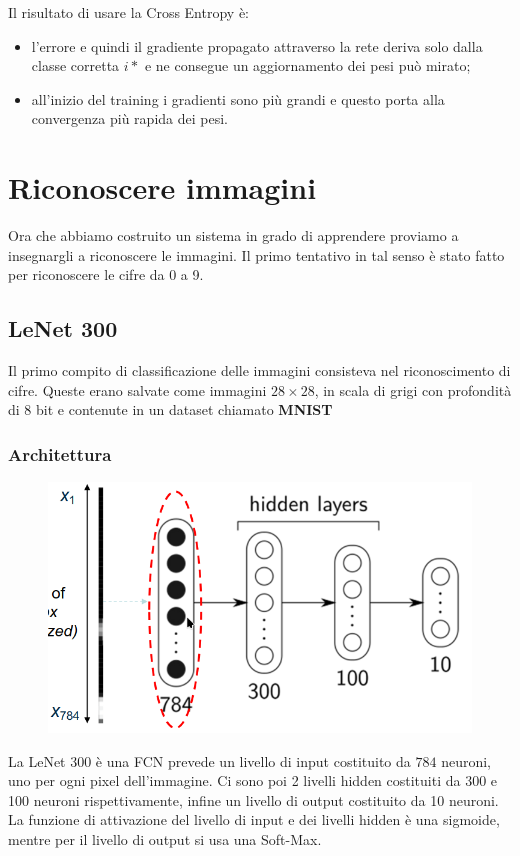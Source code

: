 Il risultato di usare la Cross Entropy è:
\begin{itemize}
	\item  l'errore e quindi il gradiente propagato attraverso la rete deriva solo dalla classe corretta $i*$ e ne consegue un aggiornamento dei pesi può mirato;
	\item  all'inizio del training i gradienti sono più grandi e questo porta alla convergenza più rapida dei pesi.
\end{itemize}

\section{Riconoscere immagini}
Ora che abbiamo costruito un sistema in grado di apprendere proviamo a insegnargli a riconoscere le immagini. Il primo tentativo in tal senso è stato fatto per riconoscere le cifre da 0 a 9.

\subsection{LeNet 300}\label{sec:LeNet300}
Il primo compito di classificazione delle immagini consisteva nel riconoscimento di cifre. Queste erano salvate come immagini $28\times28$, in scala di grigi con profondità di 8 bit e contenute in un dataset chiamato \textbf{MNIST}
\subsubsection{Architettura}
\begin{figure}
	\vspace{-1cm}
	\centering
	\includegraphics[width=.9\linewidth]{Picture/LeNet_300}
\end{figure}
La LeNet 300 è una FCN prevede un livello di input costituito da $784$ neuroni, uno per ogni pixel dell'immagine. Ci sono poi 2 livelli hidden costituiti da 300 e 100 neuroni rispettivamente, infine un livello di output costituito da 10 neuroni. La funzione di attivazione del livello di input e dei livelli hidden è una sigmoide, mentre per il livello di output si usa una Soft-Max.
